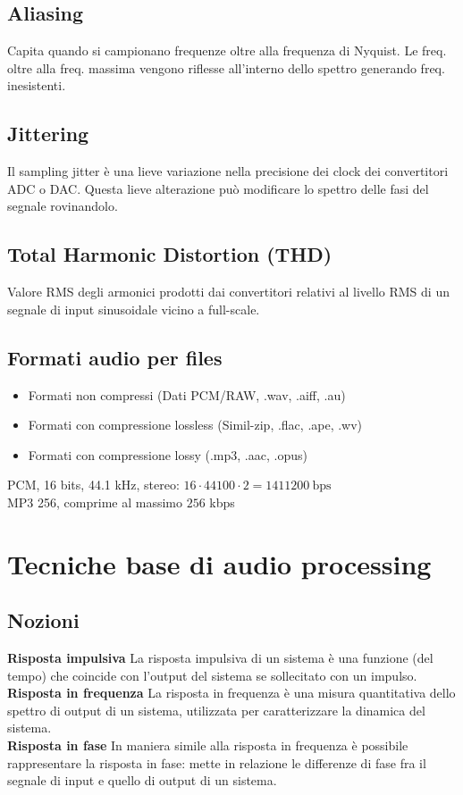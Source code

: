 \documentclass[8pt,a4paper]{article}
\begin{document}
\begin{multicols}{5}
    \subsection{Aliasing}
    Capita quando si campionano frequenze oltre alla frequenza di Nyquist.
    Le freq. oltre alla freq. massima vengono riflesse all'interno dello spettro
    generando freq. inesistenti.

    \subsection{Jittering}
    Il sampling jitter è una lieve variazione nella precisione dei clock dei 
    convertitori ADC o DAC. Questa lieve alterazione può modificare lo spettro delle 
    fasi del segnale rovinandolo.

    \subsection{Total Harmonic Distortion (THD)}
    Valore RMS degli armonici prodotti dai convertitori relativi al livello RMS di
    un segnale di input sinusoidale vicino a full-scale.

    \subsection{Formati audio per files}
    \begin{itemize}
      \item Formati non compressi (Dati PCM/RAW, .wav, .aiff, .au) 
      \item Formati con compressione lossless (Simil-zip, .flac, .ape, .wv)
      \item Formati con compressione lossy (.mp3, .aac, .opus)
    \end{itemize}
    \noindent
    PCM, 16 bits, 44.1 kHz, stereo: $16 \cdot 44100 \cdot 2 = 1411200\ \text{bps}$\\
    MP3 256, comprime al massimo $256$ kbps

    \section{Tecniche base di audio processing}
    \subsection{Nozioni}
    \textbf{Risposta impulsiva} La risposta impulsiva di un sistema è una funzione 
    (del tempo) che coincide con l’output del sistema se sollecitato con un impulso. \\
    \textbf{Risposta in frequenza} La risposta in frequenza è una misura quantitativa 
    dello spettro di output di un sistema, utilizzata per caratterizzare la dinamica 
    del sistema. \\
    \textbf{Risposta in fase} In maniera simile alla risposta in frequenza è possibile 
    rappresentare la risposta in fase: mette in relazione le differenze di fase fra il 
    segnale di input e quello di output di un sistema.


\end{multicols}
\end{document}
